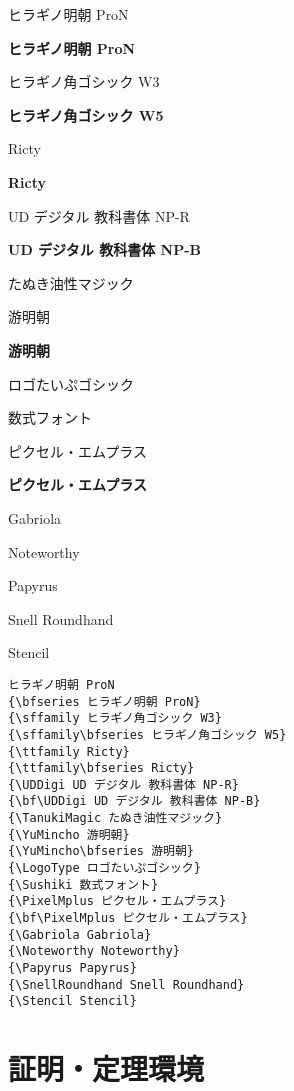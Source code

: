 \documentclass[xelatex,ja=standard,b5j,8pt,magstyle=nomag*,japaram={units}]{bxjsarticle}
\begin{document}
\begin{multicols}{2}
    

ヒラギノ明朝 ProN

{\bfseries ヒラギノ明朝 ProN}

{\sffamily ヒラギノ角ゴシック W3}

{\sffamily\bfseries ヒラギノ角ゴシック W5}

{\ttfamily Ricty}

{\ttfamily\bfseries Ricty}

{\UDDigi UD デジタル 教科書体 NP-R}

{\bf\UDDigi UD デジタル 教科書体 NP-B}

{\TanukiMagic たぬき油性マジック}

{\YuMincho 游明朝}

{\YuMincho\bfseries 游明朝}

{\LogoType ロゴたいぷゴシック}

{\Sushiki 数式フォント}

{\PixelMplus ピクセル・エムプラス}

{\bf\PixelMplus ピクセル・エムプラス}


{\Gabriola Gabriola}

{\Noteworthy Noteworthy}

{\Papyrus Papyrus}

{\SnellRoundhand Snell Roundhand}

{\Stencil Stencil}

\columnbreak

\begin{lstlisting}
ヒラギノ明朝 ProN
{\bfseries ヒラギノ明朝 ProN}
{\sffamily ヒラギノ角ゴシック W3}
{\sffamily\bfseries ヒラギノ角ゴシック W5}
{\ttfamily Ricty}
{\ttfamily\bfseries Ricty}
{\UDDigi UD デジタル 教科書体 NP-R}
{\bf\UDDigi UD デジタル 教科書体 NP-B}
{\TanukiMagic たぬき油性マジック}
{\YuMincho 游明朝}
{\YuMincho\bfseries 游明朝}
{\LogoType ロゴたいぷゴシック}
{\Sushiki 数式フォント}
{\PixelMplus ピクセル・エムプラス}
{\bf\PixelMplus ピクセル・エムプラス}
{\Gabriola Gabriola}
{\Noteworthy Noteworthy}
{\Papyrus Papyrus}
{\SnellRoundhand Snell Roundhand}
{\Stencil Stencil}
\end{lstlisting}


\end{multicols}
\fi

\newpage
\section{証明・定理環境}
\end{document}
